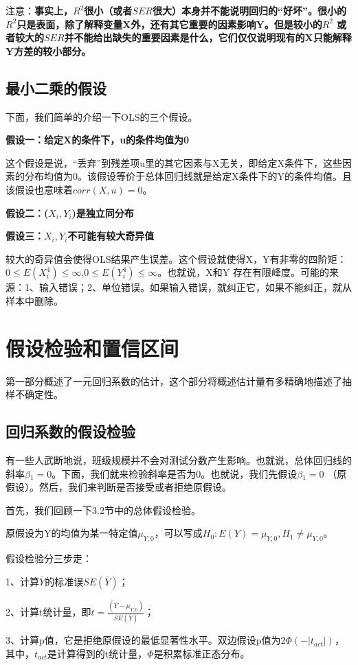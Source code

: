 \documentclass[cn,12pt,math=newtx,citestyle=gb7714-2015,bibstyle=gb7714-2015]{elegantbook}
\begin{document}
	注意：\textbf{事实上，$R^2$很小（或者$SER$很大）本身并不能说明回归的“好坏”。很小的$R^2$只是表面，除了解释变量X外，还有其它重要的因素影响Y。但是较小的$R^2$ 或者较大的$SER$并不能给出缺失的重要因素是什么，它们仅仅说明现有的X只能解释Y方差的较小部分。}
	
	\subsection{最小二乘的假设}
	下面，我们简单的介绍一下OLS的三个假设。
	
	\textbf{假设一：给定X的条件下，u的条件均值为0}
	
	这个假设是说，“丢弃”到残差项u里的其它因素与X无关，即给定X条件下，这些因素的分布均值为0。该假设等价于总体回归线就是给定X条件下的Y的条件均值。且该假设也意味着$corr(X,u)=0$。
	
	\textbf{假设二：($X_i,Y_i$)是独立同分布}
	
	\textbf{假设三：$X_i,Y_i$不可能有较大奇异值}
	
	较大的奇异值会使得OLS结果产生误差。这个假设就使得X，Y有非零的四阶矩：$0\leq{E(X_i^4)}\leq\infty$,$0\leq{E(Y_i^4)}\leq\infty$。也就说，X和Y 存在有限峰度。可能的来源：1、输入错误；2、单位错误。如果输入错误，就纠正它，如果不能纠正，就从样本中删除。
	
	\section{假设检验和置信区间}
	第一部分概述了一元回归系数的估计，这个部分将概述估计量有多精确地描述了抽样不确定性。
	
	\subsection{回归系数的假设检验}
	有一些人武断地说，班级规模并不会对测试分数产生影响。也就说，总体回归线的斜率$\beta{_1}=0$。下面，我们就来检验斜率是否为0。也就说，我们先假设$\beta{_1}=0$ （原假设）。然后，我们来判断是否接受或者拒绝原假设。
	
	首先，我们回顾一下3.2节中的总体假设检验。
	
	原假设为Y的均值为某一特定值$\mu_{Y,0}$，可以写成$H_0:E(Y)=\mu_{Y,0},H_1\neq\mu_{Y,0}$。
	
	假设检验分三步走：
	
	1、计算$\overline{Y}$的标准误$SE(\overline{Y})$；
	
	2、计算t统计量，即$t=\frac{(\overline{Y}-\mu_{Y,0})}{SE(\overline{Y})}$；
	
	3、计算p值，它是拒绝原假设的最低显著性水平。双边假设p值为$2\Phi{(-|t_{act}|)}$，其中，$t_{act}$是计算得到的t统计量，$\Phi$是积累标准正态分布。
	
\end{document}
